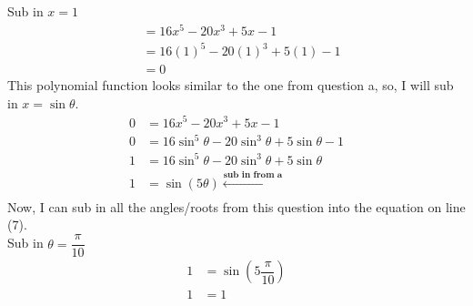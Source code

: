 \documentclass[12pt]{book}
\begin{document}
\begin{enumerate}
\begin{enumerate}
Sub in $x=1$
\setcounter{equation}{0}
\begin{align}
    &= 16x^5 - 20x^3 + 5x - 1 \\
    &= 16(1)^5 - 20(1)^3 + 5(1) - 1 \\
    &= 0
\end{align}
\iffalse %
Sub in $x=\sin(\frac{\pi}{10})$
\begin{align}
    0 &= 16\left(\sin\left(\dfrac{\pi}{10}\right)\right)^5 - 20\left(\sin\left(\dfrac{\pi}{10}\right)\right)^3 + 5\left(\sin\left(\dfrac{\pi}{10}\right)\right) - 1
\end{align}
Sub in $x=\sin(\frac{9\pi}{10})$
\begin{align}
    0 &= 16\left(\sin\left(\dfrac{9\pi}{10}\right)\right)^5 - 20\left(\sin\left(\dfrac{9\pi}{10}\right)\right)^3 + 5\left(\sin\left(\dfrac{9\pi}{10}\right)\right) - 1
\end{align}
Sub in $x=\sin(\frac{13\pi}{10})$
\begin{align}
    0 &= 16\left(\sin\left(\dfrac{13\pi}{10}\right)\right)^5 - 20\left(\sin\left(\dfrac{13\pi}{10}\right)\right)^3 + 5\left(\sin\left(\dfrac{13\pi}{10}\right)\right) - 1 
\end{align}
Sub in $x=\sin(\frac{17\pi}{10})$
\begin{align}
    0 &= 16\left(\sin\left(\dfrac{17\pi}{10}\right)\right)^5 - 20\left(\sin\left(\dfrac{17\pi}{10}\right)\right)^3 + 5\left(\sin\left(\dfrac{17\pi}{10}\right)\right) - 1 
\end{align}\\
\fi  %
This polynomial function looks similar to the one from question a, so, I will sub in $x = \sin\theta$.
\begin{align}
    0 &= 16x^5 - 20x^3 + 5x - 1 \\
    0 &= 16\sin^5\theta - 20\sin^3\theta + 5\sin\theta - 1 \\
    1 &= 16\sin^5\theta - 20\sin^3\theta + 5\sin\theta \\
    1 &= \sin(5\theta) \xleftarrow[]{\textbf{sub in from a}}
\end{align}
Now, I can sub in all the angles/roots from this question into the equation on line (7).\\
Sub in $\theta = \dfrac{\pi}{10}$
\begin{align}
    1 &= \sin\left(5\dfrac{\pi}{10}\right) \\
    1 &= 1
\end{align}

\end{enumerate}
\end{enumerate}
\end{document}
